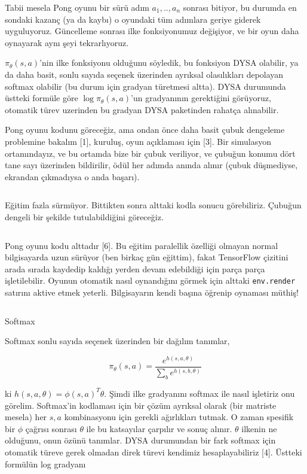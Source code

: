 \documentclass[12pt,fleqn]{article}\usepackage{../../common}
\begin{document}
Tabii mesela Pong oyunu bir sürü adım $a_1,..,a_n$ sonrası bitiyor, bu
durumda en sondaki kazanç (ya da kaybı) o oyundaki tüm adımlara geriye
giderek uyguluyoruz. Güncelleme sonrası ilke fonksiyonumuz değişiyor, ve
bir oyun daha oynayarak aynı şeyi tekrarlıyoruz.

$\pi_\theta (s,a)$'nin ilke fonksiyonu olduğunu söyledik, bu fonksiyon DYSA
olabilir, ya da daha basit, sonlu sayıda seçenek üzerinden ayrıksal
olasılıkları depolayan softmax olabilir (bu durum için gradyan türetmesi
altta). DYSA durumunda üstteki formüle göre $\log \pi_\theta (s,a)$'un
gradyanının gerektiğini görüyoruz, otomatik türev uzerinden bu gradyan DYSA
paketinden rahatça alınabilir.

Pong oyunu kodunu göreceğiz, ama ondan önce daha basit çubuk dengeleme
problemine bakalım [1], kuruluş, oyun açıklaması için [3]. Bir simulasyon
ortamındayız, ve bu ortamda bize bir çubuk veriliyor, ve çubuğun konumu
dört tane sayı üzerinden bildirilir, ödül her adımda anında alınır (çubuk
düşmediyse, ekrandan çıkmadıysa o anda başarı).

\inputminted[fontsize=\footnotesize]{python}{cartpole_train.py}

Eğitim fazla sürmüyor. Bittikten sonra alttaki kodla sonucu
görebiliriz. Çubuğun dengeli bir şekilde tutulabildiğini göreceğiz. 

\inputminted[fontsize=\footnotesize]{python}{cartpole_play.py}

Pong oyunu kodu alttadır [6]. Bu eğitim paralellik özelliği olmayan normal
bilgisayarda uzun sürüyor (ben birkaç gün eğittim), fakat TensorFlow
çizitini arada sırada kaydedip kaldığı yerden devam edebildiği için parça
parça işletilebilir. Oyunun otomatik nasıl oynandığını görmek için alttaki
\verb!env.render! satırını aktive etmek yeterli. Bilgisayarın kendi başına
öğrenip oynaması müthiş!

\inputminted[fontsize=\footnotesize]{python}{pong.py}

Softmax

Softmax sonlu sayıda seçenek üzerinden bir dağılım tanımlar,

$$ 
\pi_\theta(s,a) = \frac{e^{h(s,a,\theta)}}{\sum_b e^{h(s,b,\theta)} }
$$

ki $h(s,a,\theta) = \phi(s,a)^T\theta$. Şimdi ilke gradyanını softmax ile
nasıl işletiriz onu görelim. Softmax'in kodlaması için bir çözüm ayrıksal
olarak (bir matriste mesela) her $s,a$ kombinasyonu için gerekli
ağırlıkları tutmak. O zaman spesifik bir $\phi$ çağrısı sonrası $\theta$
ile bu katsayılar çarpılır ve sonuç alınır. $\theta$ ilkenin ne olduğunu,
onun özünü tanımlar. DYSA durumundan bir fark softmax için otomatik
türeve gerek olmadan direk türevi kendimiz hesaplayabiliriz [4]. Üstteki
formülün log gradyanı
\end{document}
